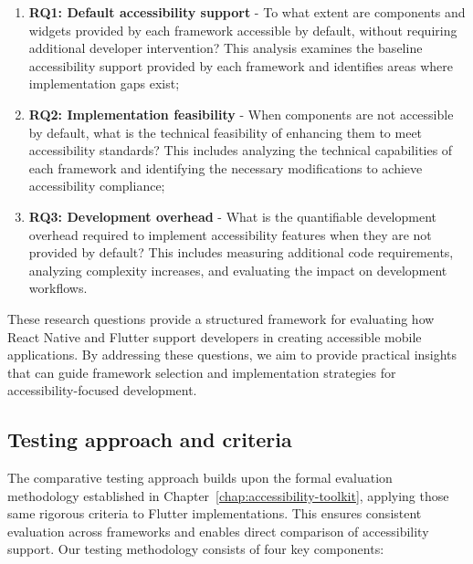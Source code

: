 \begin{enumerate}
    \item \textbf{RQ1: Default accessibility support} - To what extent are components and widgets provided by each framework accessible by default, without requiring additional developer intervention? This analysis examines the baseline accessibility support provided by each framework and identifies areas where implementation gaps exist;
    
    \item \textbf{RQ2: Implementation feasibility} - When components are not accessible by default, what is the technical feasibility of enhancing them to meet accessibility standards? This includes analyzing the technical capabilities of each framework and identifying the necessary modifications to achieve accessibility compliance;
    
    \item \textbf{RQ3: Development overhead} - What is the quantifiable development overhead required to implement accessibility features when they are not provided by default? This includes measuring additional code requirements, analyzing complexity increases, and evaluating the impact on development workflows.
\end{enumerate}

These research questions provide a structured framework for evaluating how React Native and Flutter support developers in creating accessible mobile applications. By addressing these questions, we aim to provide practical insights that can guide framework selection and implementation strategies for accessibility-focused development.

\subsection{Testing approach and criteria}

The comparative testing approach builds upon the formal evaluation methodology established in Chapter~\ref{chap:accessibility-toolkit}, applying those same rigorous criteria to Flutter implementations. This ensures consistent evaluation across frameworks and enables direct comparison of accessibility support. Our testing methodology consists of four key components:

